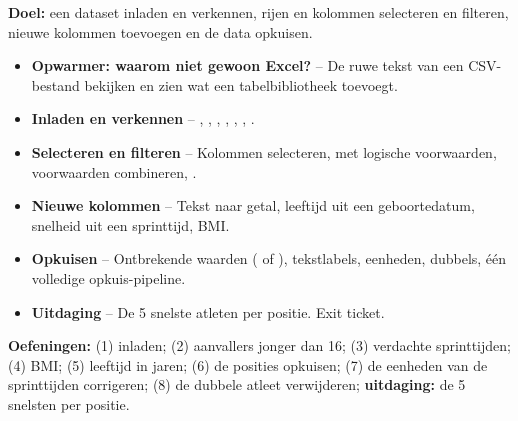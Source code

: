 \textbf{Doel:} een dataset inladen en verkennen, rijen en kolommen
selecteren en filteren, nieuwe kolommen toevoegen en de data opkuisen.

\begin{itemize}
  \item \textbf{Opwarmer: waarom niet gewoon Excel?} -- De ruwe tekst van een CSV-bestand bekijken en zien wat een tabelbibliotheek toevoegt.
  \item \textbf{Inladen en verkennen} -- , , , , , , .
  \item \textbf{Selecteren en filteren} -- Kolommen selecteren,  met logische voorwaarden, voorwaarden combineren, .
  \item \textbf{Nieuwe kolommen} -- Tekst naar getal, leeftijd uit een geboortedatum, snelheid uit een sprinttijd, BMI.
  \item \textbf{Opkuisen} -- Ontbrekende waarden ( of ), tekstlabels, eenheden, dubbels, één volledige opkuis-pipeline.
  \item \textbf{Uitdaging} -- De 5 snelste atleten per positie. Exit ticket.
\end{itemize}

\textbf{Oefeningen:} (1)  inladen; (2) aanvallers jonger
dan 16; (3) verdachte sprinttijden; (4) BMI; (5) leeftijd in jaren;
(6) de posities opkuisen; (7) de eenheden van de sprinttijden
corrigeren; (8) de dubbele atleet verwijderen; \textbf{uitdaging:} de
5 snelsten per positie.
